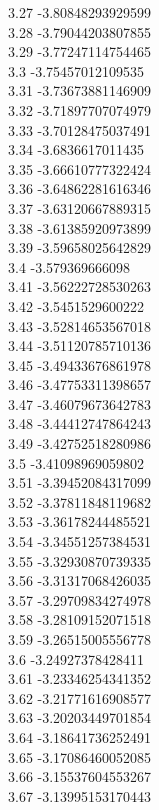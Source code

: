 {3.27	-3.80848293929599\\
3.28	-3.79044203807855\\
3.29	-3.77247114754465\\
3.3	-3.75457012109535\\
3.31	-3.73673881146909\\
3.32	-3.71897707074979\\
3.33	-3.70128475037491\\
3.34	-3.6836617011435\\
3.35	-3.66610777322424\\
3.36	-3.64862281616346\\
3.37	-3.63120667889315\\
3.38	-3.61385920973899\\
3.39	-3.59658025642829\\
3.4	-3.579369666098\\
3.41	-3.56222728530263\\
3.42	-3.5451529600222\\
3.43	-3.52814653567018\\
3.44	-3.51120785710136\\
3.45	-3.49433676861978\\
3.46	-3.47753311398657\\
3.47	-3.46079673642783\\
3.48	-3.44412747864243\\
3.49	-3.42752518280986\\
3.5	-3.41098969059802\\
3.51	-3.39452084317099\\
3.52	-3.37811848119682\\
3.53	-3.36178244485521\\
3.54	-3.34551257384531\\
3.55	-3.32930870739335\\
3.56	-3.31317068426035\\
3.57	-3.29709834274978\\
3.58	-3.28109152071518\\
3.59	-3.26515005556778\\
3.6	-3.24927378428411\\
3.61	-3.23346254341352\\
3.62	-3.21771616908577\\
3.63	-3.20203449701854\\
3.64	-3.18641736252491\\
3.65	-3.17086460052085\\
3.66	-3.15537604553267\\
3.67	-3.13995153170443\\
}
